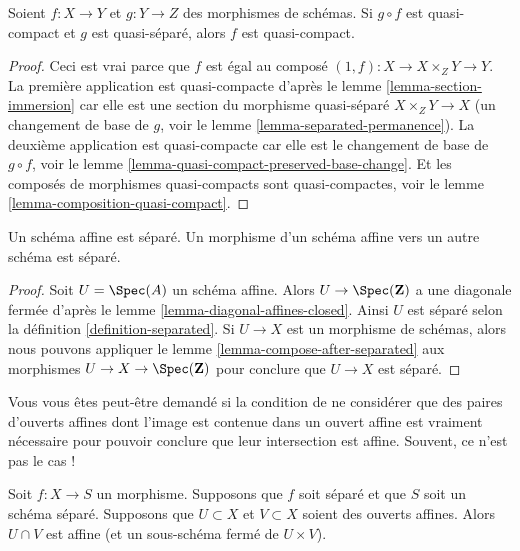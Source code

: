 \begin{lemma}
\label{lemma-quasi-compact-permanence}
Soient $f : X \to Y$ et $g : Y \to Z$ des morphismes de schémas.
Si $g \circ f$ est quasi-compact et $g$ est quasi-séparé,
alors $f$ est quasi-compact.
\end{lemma}

\begin{proof}
Ceci est vrai parce que $f$ est égal au composé
$(1, f) : X \to X \times_Z Y \to Y$. La première application
est quasi-compacte d'après le lemme \ref{lemma-section-immersion}
car elle est une section du morphisme quasi-séparé $X \times_Z Y \to X$ (un changement
de base de $g$, voir le lemme \ref{lemma-separated-permanence}). La
deuxième application est quasi-compacte car
elle est le changement de base de $g \circ f$,
voir le lemme \ref{lemma-quasi-compact-preserved-base-change}.
Et les composés de morphismes
quasi-compacts sont quasi-compactes, voir le lemme \ref{lemma-composition-quasi-compact}.
\end{proof}

\begin{lemma}
\label{lemma-affine-separated}
Un schéma affine est séparé. Un morphisme d'un schéma affine
vers un autre schéma est séparé.
\end{lemma}

\begin{proof}
Soit $U = \Spec(A)$ un schéma affine. Alors $U \to \Spec(\mathbf{Z})$ a une
diagonale fermée d'après le lemme \ref{lemma-diagonal-affines-closed}.
Ainsi $U$ est séparé selon la définition \ref{definition-separated}.
Si $U \to X$ est un morphisme de schémas, alors nous pouvons
appliquer le lemme \ref{lemma-compose-after-separated}
aux morphismes $U \to X \to \Spec(\mathbf{Z})$ pour
conclure que $U \to X$ est séparé.
\end{proof}

\noindent
Vous vous êtes peut-être demandé si la condition de ne
considérer que des paires d'ouverts affines dont l'image est contenue dans un
ouvert affine est vraiment nécessaire pour pouvoir conclure que leur
intersection est affine. Souvent, ce n'est pas le cas !

\begin{lemma}
\label{lemma-curiosity}
Soit $f : X \to S$ un morphisme.
Supposons que $f$ soit séparé et que $S$ soit un schéma séparé.
Supposons que $U \subset X$ et $V \subset X$ soient des ouverts
affines. Alors $U \cap V$ est affine (et un sous-schéma fermé de $U \times V$).
\end{lemma}

